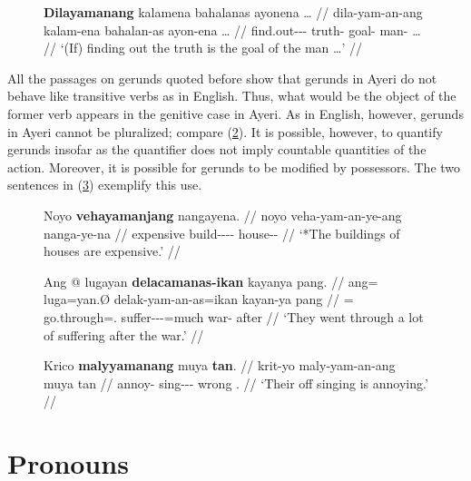 \begin{figure}[h]
\ex\label{ex:scimethgerund}\begingl
	\gla \textbf{Dilayamanang} kalamena bahalanas ayonena … //
	\glb dila-yam-an-ang kalam-ena bahalan-as ayon-ena … //
	\glc find.out-\Ptcp{}-\Nmlz{}-\Aarg{} truth-\Gen{} goal-\Parg{} 
		man-\Gen{} … //
	\glft `(If) finding out the truth is the goal of the man …' //
\endgl\xe
\end{figure}

All the passages on gerunds quoted before show that gerunds in Ayeri do
not behave like transitive verbs as in English. Thus, what would be the object
of the former verb appears in the genitive case in Ayeri. As in English,
however, gerunds in Ayeri cannot be pluralized; compare (\ref{ex:grndplur}). It
is possible, however, to quantify gerunds insofar as the quantifier does not
imply countable quantities of the action. Moreover, it is possible for gerunds
to be modified by possessors. The two sentences in (\ref{ex:grndmod}) exemplify
this use.

\begin{figure}[h]
\ex\label{ex:grndplur}\ljudge*\begingl
	\gla Noyo \textbf{vehayamanjang} nangayena. //
	\glb noyo veha-yam-an-ye-ang nanga-ye-na //
	\glc expensive build-\Ptcp{}-\Nmlz{}-\Pl{}-\Aarg{} house-\Pl{}-\Gen{} //
	\glft `*The buildings of houses are expensive.' //
\endgl\xe
\end{figure}

\begin{figure}[h]
\pex\label{ex:grndmod}
\a\begingl
	\gla Ang @ lugayan \textbf{delacamanas-ikan} kayanya pang. //
	\glb ang= luga=yan.Ø delak-yam-an-as=ikan kayan-ya pang //
	\glc \AgtT{}= go.through=\TplM{}.\Top{} 
		suffer-\Ptcp{}-\Nmlz{}-\Parg{}=much war-\Loc{} after //
	\glft `They went through a lot of suffering after the war.' //
\endgl

\a\begingl
	\gla Krico \textbf{malyyamanang} muya \textbf{tan}. //
	\glb krit-yo maly-yam-an-ang muya tan //
	\glc annoy-\TsgN{} sing-\Ptcp{}-\Nmlz{}-\Aarg{} wrong \TplM{}.\Gen{} //
	\glft `Their off singing is annoying.' //
\endgl
\xe
\end{figure}


\section{Pronouns}

